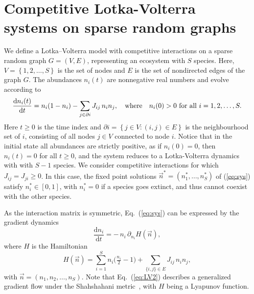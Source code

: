 \documentclass[11pt,a4paper]{article}
\begin{document}
\section{Competitive Lotka-Volterra systems on sparse random graphs}
We define a Lotka--Volterra model with competitive interactions on a sparse random graph $G = (V,E)$, representing an ecosystem with $S$ species.    Here, $V=\left\{1,2,\ldots,S\right\}$ is the set of nodes and $E$ is the set of nondirected edges of the graph $G$.  The abundances $n_i(t)$ are nonnegative real numbers and   evolve according to 
\begin{equation}
    \frac{\mathrm{d} n_i(t)}{\mathrm{d}t}
    = n_i(1-n_i) - \sum_{j\in\partial i} J_{ij}\, n_i n_j, \quad {\rm where} \quad n_i(0)>0 \text{ for all } i=1,2,\dots, S.
    \label{eq:sys}
\end{equation} 
Here $t\geq 0$  is  the time index and  $\partial i = \left\{j\in V: (i,j)\in E\right\}$ is the neighbourhood set of $i$, consisting of all nodes $j\in V$ connected to node $i$.  Notice that in the initial state all abundances are strictly positive, as if $n_i(0)=0$, then $n_i(t)=0$ for all $t\geq 0$,  and the system reduces to a Lotka-Volterra dynamics with with $S-1$ species.    We consider competitive interactions  for which $J_{ij} = J_{ji}\geq 0$.   In this case, the fixed point solutions $\vec{n}^\ast = (n^\ast_1,\ldots,n^\ast_S)$ of (\ref{eq:sys})  satisfy $n^\ast_i\in [0,1]$, with $n^\ast_i = 0$ if a species goes extinct, and thus cannot coexist with the other species.    

As the interaction matrix is symmetric, Eq.~(\ref{eq:sys}) can be expressed by the  gradient dynamics
\begin{equation}
    \frac{\mathrm{d} n_i}{\mathrm{d} t} 
    = -\,n_i \,\partial_{n_i} H(\vec n), \label{eq:LV2}
\end{equation}
where $H$ is the Hamiltonian 
\begin{equation}
    H(\vec n)
    = \sum_{i=1}^S n_i \Big(\tfrac{n_i}{2}-1\Big)
      + \sum_{\{i,j\}\in E} J_{ij}\,n_i n_j,
    \label{eq:energy}
\end{equation}
with $\vec n = (n_1,n_2,\ldots,n_S)$.
Note that Eq.~(\ref{eq:LV2}) describes a generalized gradient flow under the Shahshahani metric~\cite[p.~123]{hofbauer2003evolutionary}, with $H$ being a Lyapunov function.
\end{document}
